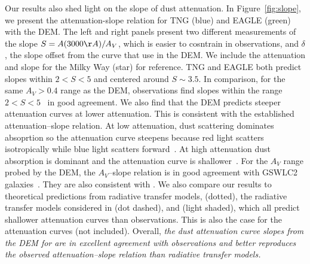 Our results also shed light on the slope of dust attenuation. In Figure~\ref{fig:slope}, 
we present the attenuation-slope relation for TNG (blue) and EAGLE (green) with the DEM.
The left and right panels present two different measurements of the slope $S =
A(3000\AA)/A_V$, which is easier to cosntrain in observations, and $\delta$,
the slope offset from the \cite{calzetti2001} curve that use in the DEM. 
We include the attenuation and slope for the Milky Way (star) for reference.
TNG and EAGLE both predict slopes within $2 < S < 5$ and centered around $S\sim
3.5$. In comparison, for the same $A_V > 0.4$ range as the DEM, observations 
find slopes within the range $2 < S < 5$~\citep{calzetti2000, burgarella2005, johnson2007,
conroy2010b, wild2011, battisti2016, battisti2017, leja2017, salim2018} in good
agreement. We also find that the DEM predicts steeper attenuation curves at 
lower attenuation. This is consistent with the established attenuation--slope
relation. At low attenuation, dust scattering dominates absoprtion so the 
attenuation curve steepens because red light scatters isotropically while blue light
scatters forward~\citep{gordon1994, witt2000, draine2003}. %
At high attenuation dust absorption is dominant and the attenuation curve is
shallower~\citep{chevallard2013}. For the $A_V$ range probed by the DEM, the
$A_V$--slope relation is in good agreement with GSWLC2 galaxies~\citep[black shaded][]{salim2020}.
They are also consistent with \cite{leja2017}. We also compare our results to
theoretical predictions from radiative transfer models, \cite{inoue2005}
(dotted), the radiative transfer models considered in \cite{chevallard2013}
(dot dashed), and \cite{trayford2020} (light shaded), which all predict shallower 
attenuation curves than observations. This is also the case for the
\cite{narayanan2018} attenuation curves (not included). 
Overall, \emph{the dust attenuation curve slopes from the DEM for are in
excellent agreement with observations and better reproduces the observed
attenuation--slope relation than radiative transfer models.}



